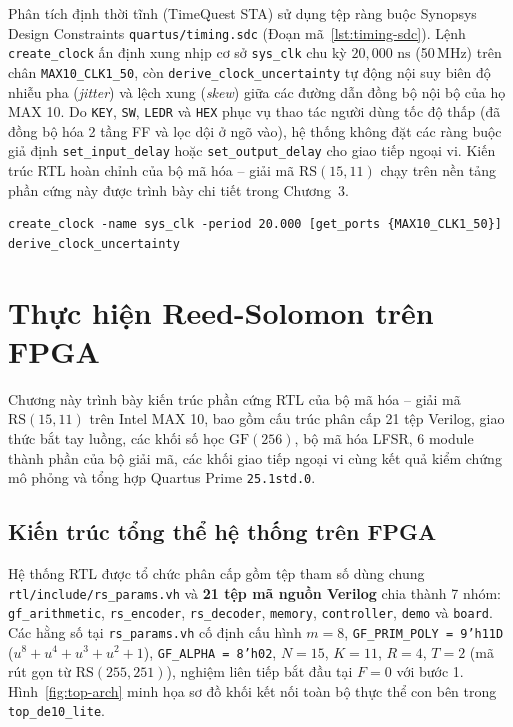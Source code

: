 \documentclass[11pt,a4paper]{report}
\begin{document}
Phân tích định thời tĩnh (TimeQuest STA) \cite{quartussta} sử dụng tệp ràng buộc Synopsys Design Constraints \texttt{quartus/timing.sdc} (Đoạn mã~\ref{lst:timing-sdc}). Lệnh \texttt{create\_clock} ấn định xung nhịp cơ sở \texttt{sys\_clk} chu kỳ $20{,}000\text{ ns}$ (50\,MHz) trên chân \texttt{MAX10\_CLK1\_50}, còn \texttt{derive\_clock\_uncertainty} tự động nội suy biên độ nhiễu pha (\textit{jitter}) và lệch xung (\textit{skew}) giữa các đường dẫn đồng bộ nội bộ của họ MAX 10. Do \texttt{KEY}, \texttt{SW}, \texttt{LEDR} và \texttt{HEX} phục vụ thao tác người dùng tốc độ thấp (đã đồng bộ hóa 2 tầng FF và lọc dội ở ngõ vào), hệ thống không đặt các ràng buộc giả định \texttt{set\_input\_delay} hoặc \texttt{set\_output\_delay} cho giao tiếp ngoại vi. Kiến trúc RTL hoàn chỉnh của bộ mã hóa -- giải mã $\text{RS}(15,11)$ chạy trên nền tảng phần cứng này được trình bày chi tiết trong Chương~3.

\begin{lstlisting}[style=tclstyle, caption={Nội dung tệp ràng buộc thời gian \texttt{quartus/timing.sdc}}, label={lst:timing-sdc}]
create_clock -name sys_clk -period 20.000 [get_ports {MAX10_CLK1_50}]
derive_clock_uncertainty
\end{lstlisting}


\chapter{Thực hiện Reed-Solomon trên FPGA}
\label{ch:rs-fpga}

Chương này trình bày kiến trúc phần cứng RTL của bộ mã hóa -- giải mã $\text{RS}(15,11)$ trên Intel MAX 10, bao gồm cấu trúc phân cấp 21 tệp Verilog, giao thức bắt tay luồng, các khối số học $\text{GF}(256)$, bộ mã hóa LFSR, 6 module thành phần của bộ giải mã, các khối giao tiếp ngoại vi cùng kết quả kiểm chứng mô phỏng và tổng hợp Quartus Prime \texttt{25.1std.0}.

\section{Kiến trúc tổng thể hệ thống trên FPGA}
\label{sec:top-arch}

Hệ thống RTL được tổ chức phân cấp gồm tệp tham số dùng chung \texttt{rtl/include/rs\_params.vh} và \textbf{21 tệp mã nguồn Verilog} chia thành 7 nhóm: \texttt{gf\_arithmetic}, \texttt{rs\_encoder}, \texttt{rs\_decoder}, \texttt{memory}, \texttt{controller}, \texttt{demo} và \texttt{board}. Các hằng số tại \texttt{rs\_params.vh} cố định cấu hình $m = 8$, \texttt{GF\_PRIM\_POLY = 9'h11D} ($u^8+u^4+u^3+u^2+1$), \texttt{GF\_ALPHA = 8'h02}, $N = 15$, $K = 11$, $R = 4$, $T = 2$ (mã rút gọn từ $\text{RS}(255,251)$), nghiệm liên tiếp bắt đầu tại $F = 0$ với bước 1. Hình~\ref{fig:top-arch} minh họa sơ đồ khối kết nối toàn bộ thực thể con bên trong \texttt{top\_de10\_lite}.
\end{document}
